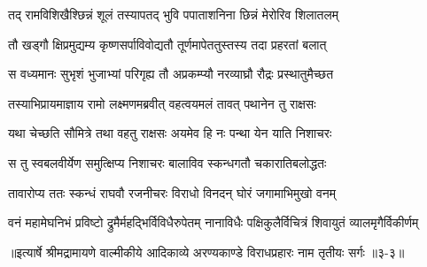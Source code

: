 \twolineshloka
{तद् रामविशिखैश्छिन्नं शूलं तस्यापतद् भुवि}
{पपाताशनिना छिन्नं मेरोरिव शिलातलम्} %

\twolineshloka
{तौ खड्गौ क्षिप्रमुद्यम्य कृष्णसर्पाविवोद्यतौ}
{तूर्णमापेततुस्तस्य तदा प्रहरतां बलात्} %

\twolineshloka
{स वध्यमानः सुभृशं भुजाभ्यां परिगृह्य तौ}
{अप्रकम्प्यौ नरव्याघ्रौ रौद्रः प्रस्थातुमैच्छत} %

\twolineshloka
{तस्याभिप्रायमाज्ञाय रामो लक्ष्मणमब्रवीत्}
{वहत्वयमलं तावत् पथानेन तु राक्षसः} %

\twolineshloka
{यथा चेच्छति सौमित्रे तथा वहतु राक्षसः}
{अयमेव हि नः पन्था येन याति निशाचरः} %

\twolineshloka
{स तु स्वबलवीर्येण समुत्क्षिप्य निशाचरः}
{बालाविव स्कन्धगतौ चकारातिबलोद्धतः} %

\twolineshloka
{तावारोप्य ततः स्कन्धं राघवौ रजनीचरः}
{विराधो विनदन् घोरं जगामाभिमुखो वनम्} %

\twolineshloka
{वनं महामेघनिभं प्रविष्टो द्रुमैर्महद्भिर्विविधैरुपेतम्}
{नानाविधैः पक्षिकुलैर्विचित्रं शिवायुतं व्यालमृगैर्विकीर्णम्} %


॥इत्यार्षे श्रीमद्रामायणे वाल्मीकीये आदिकाव्ये अरण्यकाण्डे विराधप्रहारः नाम तृतीयः सर्गः ॥३-३॥
